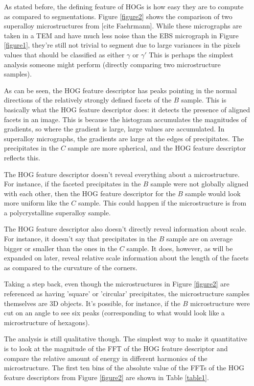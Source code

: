 \documentclass[review]{elsarticle}
\begin{document}
	As stated before, the defining feature of HOGs is how easy they are to compute as compared to segmentations. Figure \ref{figure2} shows the comparison of two superalloy microstructures from [cite Faehrmann]. While these micrographs are taken in a TEM and have much less noise than the EBS micrograph in Figure \ref{figure1}, they're still not trivial to segment due to large variances in the pixels values that should be classified as either $\gamma$ or $\gamma'$ This is perhaps the simplest analysis someone might perform (directly comparing two microstructure samples).

	As can be seen, the HOG feature descriptor has peaks pointing in the normal directions of the relatively strongly defined facets of the $B$ sample. This is basically what the HOG feature descriptor does: it detects the presence of aligned facets in an image. This is because the histogram accumulates the magnitudes of gradients, so where the gradient is large, large values are accumulated. In superalloy micrographs, the gradients are large at the edges of precipitates. The precipitates in the $C$ sample are more spherical, and the HOG feature descriptor reflects this.
	
	The HOG feature descriptor doesn't reveal everything about a microstructure. For instance, if the faceted precipitates in the $B$ sample were not globally aligned with each other, then the HOG feature descriptor for the $B$ sample would look more uniform like the $C$ sample. This could happen if the microstructure is from a polycrystalline superalloy sample.
	
	The HOG feature descriptor also doesn't directly reveal information about scale. For instance, it doesn't say that precipitates in the $B$ sample are on average bigger or smaller than the ones in the $C$ sample. It does, however, as will be expanded on later, reveal relative scale information about the length of the facets as compared to the curvature of the corners.
	
	Taking a step back, even though the microstructures in Figure \ref{figure2} are referenced as having 'square' or 'circular' precipitates, the microstructure samples themselves are 3D objects. It's possible, for instance, if the $B$ microstructure were cut on an angle to see six peaks (corresponding to what would look like a microstructure of hexagons).
	
	The analysis is still qualitative though. The simplest way to make it quantitative is to look at the magnitude of the FFT of the HOG feature descriptor and compare the relative amount of energy in different harmonics of the microstructure. The first ten bins of the absolute value of the FFTs of the HOG feature descriptors from Figure \ref{figure2} are shown in Table \ref{table1}.
	
\end{document}
